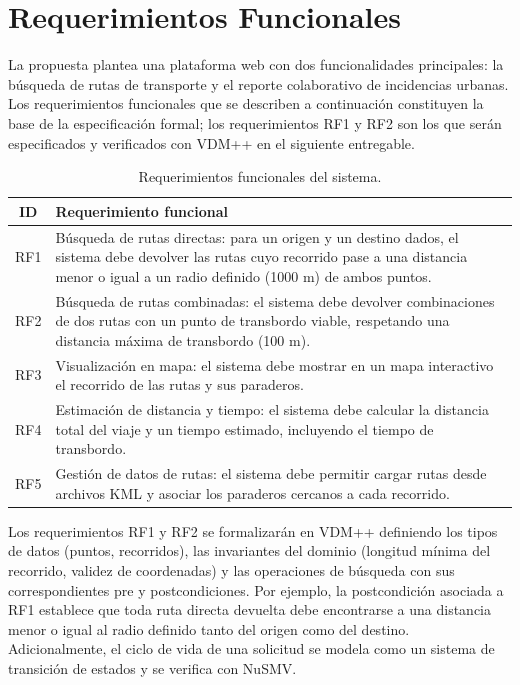 \section{Requerimientos Funcionales}
\label{sec:requerimientos}

La propuesta plantea una plataforma web con dos funcionalidades principales: la búsqueda de rutas de transporte y el reporte colaborativo de incidencias urbanas. Los requerimientos funcionales que se describen a continuación constituyen la base de la especificación formal; los requerimientos RF1 y RF2 son los que serán especificados y verificados con VDM++ en el siguiente entregable.

\begin{table}[htbp]
\centering
\small
\caption{Requerimientos funcionales del sistema.}
\label{tab:rf}
\begin{tabular}{|c|p{6.6cm}|}
\hline
ID & Requerimiento funcional \\
\hline
RF1 & Búsqueda de rutas directas: para un origen y un destino dados, el sistema debe devolver las rutas cuyo recorrido pase a una distancia menor o igual a un radio definido (1000 m) de ambos puntos. \\
\hline
RF2 & Búsqueda de rutas combinadas: el sistema debe devolver combinaciones de dos rutas con un punto de transbordo viable, respetando una distancia máxima de transbordo (100 m). \\
\hline
RF3 & Visualización en mapa: el sistema debe mostrar en un mapa interactivo el recorrido de las rutas y sus paraderos. \\
\hline
RF4 & Estimación de distancia y tiempo: el sistema debe calcular la distancia total del viaje y un tiempo estimado, incluyendo el tiempo de transbordo. \\
\hline
RF5 & Gestión de datos de rutas: el sistema debe permitir cargar rutas desde archivos KML y asociar los paraderos cercanos a cada recorrido. \\
\hline
\end{tabular}
\end{table}

Los requerimientos RF1 y RF2 se formalizarán en VDM++ definiendo los tipos de datos (puntos, recorridos), las invariantes del dominio (longitud mínima del recorrido, validez de coordenadas) y las operaciones de búsqueda con sus correspondientes pre y postcondiciones. Por ejemplo, la postcondición asociada a RF1 establece que toda ruta directa devuelta debe encontrarse a una distancia menor o igual al radio definido tanto del origen como del destino. Adicionalmente, el ciclo de vida de una solicitud se modela como un sistema de transición de estados y se verifica con NuSMV.

